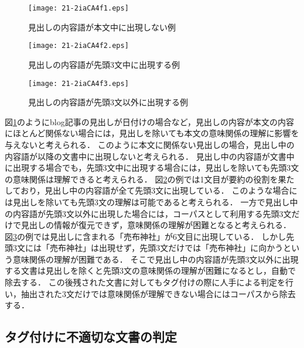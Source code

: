 \documentclass[japanese]{jnlp_1.4}
\begin{document}
\begin{figure}[b]
\begin{center}
\texttt{[image: 21-2iaCA4f1.eps]}
\end{center}
\caption{見出しの内容語が本文中に出現しない例}
\label{見出しが本文中に出現しない例}
\end{figure}
\begin{figure}[b]
\begin{center}
\texttt{[image: 21-2iaCA4f2.eps]}
\end{center}
\caption{見出しの内容語が先頭3文中に出現する例}
\label{見出しの要素が先頭3文中に出現する例}
\end{figure}
\begin{figure}[b]
\begin{center}
\texttt{[image: 21-2iaCA4f3.eps]}
\end{center}
\caption{見出しの内容語が先頭3文以外に出現する例}
\label{見出しを除くと意味・談話関係の理解が困難になる例}
\end{figure}

図\ref{見出しが本文中に出現しない例}のようにblog記事の見出しが日付けの場合など，見出しの内容が本文の内容にほとんど関係ない場合には，見出しを除いても本文の意味関係の理解に影響を与えないと考えられる．
このように本文に関係ない見出しの場合，見出し中の内容語が以降の文書中に出現しないと考えられる．
見出し中の内容語が文書中に出現する場合でも，先頭3文中に出現する場合には，見出しを除いても先頭3文の意味関係は理解できると考えられる．
図\ref{見出しの要素が先頭3文中に出現する例}の例では1文目が要約の役割を果たしており，見出し中の内容語が全て先頭3文に出現している．
このような場合には見出しを除いても先頭3文の理解は可能であると考えられる．
一方で見出し中の内容語が先頭3文以外に出現した場合には，コーパスとして利用する先頭3文だけで見出しの情報が復元できず，意味関係の理解が困難となると考えられる．
図\ref{見出しを除くと意味・談話関係の理解が困難になる例}の例では見出しに含まれる「売布神社」が6文目に出現している．
しかし先頭3文には「売布神社」は出現せず，先頭3文だけでは「売布神社」に向かうという意味関係の理解が困難である．
そこで見出し中の内容語が先頭3文以外に出現する文書は見出しを除くと先頭3文の意味関係の理解が困難になるとし，自動で除去する．
この後残された文書に対してもタグ付けの際に人手による判定を行い，抽出された3文だけでは意味関係が理解できない場合にはコーパスから除去する．


\subsection{タグ付けに不適切な文書の判定}
\label{タグ付けに不適切な文書の判定}
\end{document}
